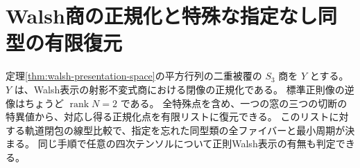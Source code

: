 \section{Walsh商の正規化と特殊な指定なし同型の有限復元}
\label{sec:walsh-spectral-fibers}
\begin{theorem}\label{thm:walsh-spectral-fibers}
定理\ref{thm:walsh-presentation-space}の平方行列の二重被覆の $S_3$ 商を $Y$ とする。
$Y$ は、Walsh表示の射影不変式商における閉像の正規化である。
標準正則像の逆像はちょうど $\operatorname{rank} N=2$ である。
全特殊点を含め、一つの窓の三つの切断の特異値から、対応し得る正規化点を有限リストに復元できる。
このリストに対する軌道閉包の線型比較で、指定を忘れた同型類の全ファイバーと最小周期が決まる。
同じ手順で任意の四次テンソルについて正則Walsh表示の有無も判定できる。
\end{theorem}
